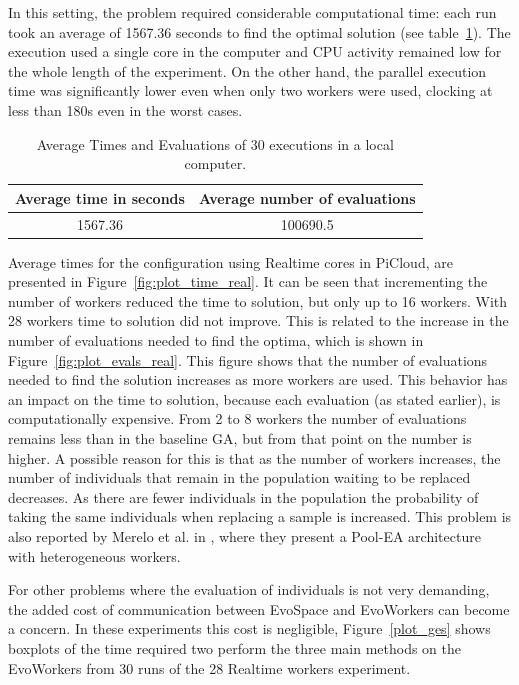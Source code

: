In this setting, the problem required considerable computational time: each run took an average of 1567.36 seconds to find the optimal solution (see table~\ref{local}).
The execution used a single core in the computer and CPU activity remained low for the whole length of the experiment. On the other hand, the parallel execution time was significantly lower even when only two workers were used,
clocking at less than 180s even in the worst cases.

\begin{table}[t]
\renewcommand{\arraystretch}{1.3}
\caption{Average Times and Evaluations of 30 executions in a local computer.}
\label{local}
\centering
\begin{tabular}{|c|c|}
\hline
Average time in seconds & Average number of evaluations \\
\hline
1567.36 & 100690.5  \\
\hline
\end{tabular}
\end{table}

Average times for the configuration using Realtime cores in PiCloud,
are presented in Figure~\ref{fig:plot_time_real}. It can be seen that
incrementing the number of workers reduced the time to solution, but only up to 16 workers. With 28 workers time to solution did not improve. This is
related to the increase in the number of evaluations needed to find
the optima, which is shown in Figure~\ref{fig:plot_evals_real}.
This figure shows that the number of evaluations needed to find the
solution increases as more workers are used. This behavior has an
impact on the time to solution, because each evaluation (as stated
earlier), is computationally expensive. From 2 to 8 workers the number
of evaluations remains less than in the baseline GA, but from that point on
the number is higher. A possible reason for this is that as
the number of workers increases, the number of individuals that remain
in the population waiting to be replaced decreases. As there are fewer
individuals in the population the probability of taking the same individuals
when replacing a sample is increased. This problem is also reported
by Merelo et al. in  \cite{sofea:naco}, where they present a Pool-EA architecture with heterogeneous workers.

For other problems where the evaluation of individuals is not very
demanding, the added cost of communication between EvoSpace and EvoWorkers can become a concern.
In these experiments this cost is negligible, Figure~\ref{plot_ges} shows boxplots of the time required two perform the
three main methods on the EvoWorkers from 30 runs of the 28 Realtime workers experiment.


